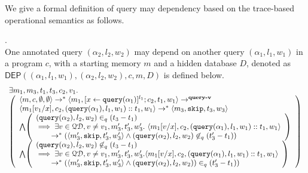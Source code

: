 \documentclass[a4paper,11pt]{article}
\begin{document}
{
   We give a formal definition of query may dependency based on the trace-based operational semantics as follows.
   }
%
% 
%
\begin{defn}
.
\label{def:query_dep}
\\
{
One annotated query $({\alpha}_2,l_2, w_2)$ may depend on another query $({\alpha}_1, l_1, w_1)$ in a program $c$,
with a starting memory $m$ and a hidden database $D$, denoted as 
%
$\mathsf{DEP}({(\alpha_1, l_1, w_1)}, ({\alpha}_2, l_2, w_2), c, m, D)$ is defined below. 
}
{
\[
\begin{array}{l}
\exists m_1,m_3,t_1,t_3,c_2,v_1.\\
  \left (\begin{array}{l}   
\config{m, c, \emptyset ,\emptyset} \rightarrow^{*} 
\config{m_1, [\assign{x}{\query({\alpha}_1)}]^{l_1} ; c_2,
  t_1, w_1} 
\rightarrow^{\textbf{query-v}} 
\\ 
\config{m_1[v_1/x], c_2,
(\query({\alpha}_1),l_1, w_1)::t_1, w_1} \rightarrow^{*} \config{m_3, \eskip,
t_3,w_3}
 \\ 
 \bigwedge
  \left( 
  \begin{array}{l}
  (\query({\alpha}_2),l_2,w_2) \in_{q} (t_3-t_1) 
  \\
  \implies 
  \exists v \in \qdom, v \neq v_1, m_3', t_3', w_3'. ~  
  \config{m_1[v/x], {c_2}, (\query({\alpha}_1),l_1, w_1)::t_1, w_1} 
  \\ 
  \quad \quad 
  \rightarrow^{*}
  (\config{m_3', \eskip, t_3', w_3'} 
  \land 
  (\query({\alpha}_2),l_2,w_2) \not \in_{q} (t_3'-t_1))
\end{array} \right )
\\
\bigwedge
\left( 
  \begin{array}{l}
	(\query({\qval}_2),l_2,w_2) \not\in_{q} (t_3-t_1)
  	\\
  	\implies 
	\exists v \in \qdom, v \neq v_1, m_3', t_3', w_3'. 
	\config{m_1[v/x], {c_2}, (\query({\qval}_1),l_1,w_1)::t_1, w_1}
	\\ 
	\quad \quad 
	\rightarrow^{*} 
	(\config{m_3', \eskip, t_3', w_3'} 
	\land 
	(\query({\qval}_2),l_2,w_2))  \in_{q} (t_3'-t_1))
\end{array} \right )
\end{array} \right )
\end{array}
\]
}
\end{defn}
%
%
\end{document}
